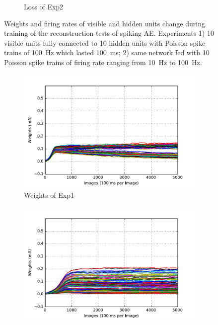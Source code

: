 \begin{figure}
\begin{subfigure}[t]{0.4\textwidth}
		\caption{Loss of Exp2}
	\end{subfigure}
	\caption{Weights and firing rates of visible and hidden units change during training of the reconstruction tests of spiking AE. 
		Experiments 1) 10 visible units fully connected to 10 hidden units with Poisson spike trains of 100~Hz which lasted 100~ms; 2) same network fed with 10 Poisson spike trains of firing rate ranging from 10~Hz to 100~Hz.}
\end{figure}

\begin{figure}
	\centering
	\begin{subfigure}[t]{0.4\textwidth}
		\includegraphics[width=\textwidth]{pics_sdlm/13_exp_SRBM_noise_long/exp1_weights_s.pdf}
		\caption{Weights of Exp1}
	\end{subfigure}
	\begin{subfigure}[t]{0.4\textwidth}
		\includegraphics[width=\textwidth]{pics_sdlm/13_exp_SRBM_noise_long/exp2_weights_s.pdf}

\end{subfigure}
\end{figure}
